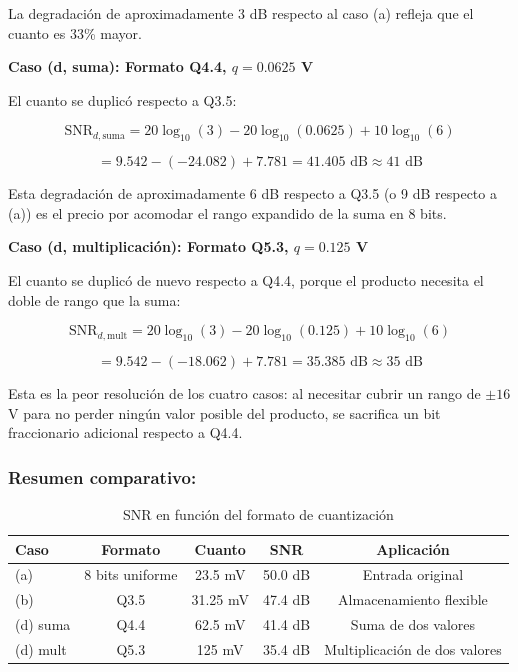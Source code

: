 \documentclass[12pt]{article}
\begin{document}
La degradación de aproximadamente 3 dB respecto al caso (a) refleja que el cuanto es 33\% mayor.
 
\textbf{Caso (d, suma): Formato Q4.4, $q = 0.0625$ V}

El cuanto se duplicó respecto a Q3.5:

\begin{equation}
\text{SNR}_{d,\text{suma}} = 20 \log_{10}(3) - 20 \log_{10}(0.0625) + 10 \log_{10}(6)
\end{equation}

\begin{equation}
= 9.542 - (-24.082) + 7.781 = 41.405 \text{ dB} \approx \boxed{41 \text{ dB}}
\end{equation}

Esta degradación de aproximadamente 6 dB respecto a Q3.5 (o 9 dB respecto a (a)) es el precio por acomodar el rango expandido de la suma en 8 bits.

\textbf{Caso (d, multiplicación): Formato Q5.3, $q = 0.125$ V}

El cuanto se duplicó de nuevo respecto a Q4.4, porque el producto necesita el doble de rango que la suma:

\begin{equation}
\text{SNR}_{d,\text{mult}} = 20 \log_{10}(3) - 20 \log_{10}(0.125) + 10 \log_{10}(6)
\end{equation}

\begin{equation}
= 9.542 - (-18.062) + 7.781 = 35.385 \text{ dB} \approx \boxed{35 \text{ dB}}
\end{equation}

Esta es la peor resolución de los cuatro casos: al necesitar cubrir un rango de $\pm 16$ V para no perder ningún valor posible del producto, se sacrifica un bit fraccionario adicional respecto a Q4.4.
 
\subsubsection*{Resumen comparativo:}
 
\begin{table}[H]
\centering
\begin{tabular}{lcccc}
\toprule
\textbf{Caso} & \textbf{Formato} & \textbf{Cuanto} & \textbf{SNR} & \textbf{Aplicación} \\
\midrule
(a) & 8 bits uniforme & 23.5 mV & 50.0 dB & Entrada original \\
(b) & Q3.5 & 31.25 mV & 47.4 dB & Almacenamiento flexible \\
(d) suma & Q4.4 & 62.5 mV & 41.4 dB & Suma de dos valores \\
(d) mult & Q5.3 & 125 mV & 35.4 dB & Multiplicación de dos valores \\
\bottomrule
\end{tabular}
\caption{SNR en función del formato de cuantización}
\end{table}
 
\end{document}

